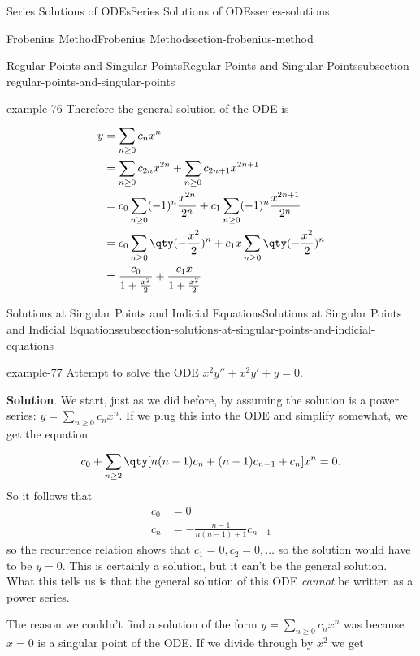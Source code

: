 \documentclass[oneside,10pt,]{book}
\numberwithin{equation}{section}
\newcommand{\amp}{&}
\begin{document}
\begin{chapterptx}{Series Solutions of ODEs}{}{Series Solutions of ODEs}{}{}{series-solutions}
\begin{sectionptx}{Frobenius Method}{}{Frobenius Method}{}{}{section-frobenius-method}
\begin{subsectionptx}{Regular Points and Singular Points}{}{Regular Points and Singular Points}{}{}{subsection-regular-points-and-singular-points}
\begin{example}{}{example-76}
Therefore the general solution of the ODE is%
\begin{align*}
y \amp= \sum_{n\geq0}^{}c_{n}x^{n}\\
\amp= \sum_{n\geq0}c_{2n}x^{2n} + \sum_{n\geq0}c_{2n+1}x^{2n+1}\\
\amp= c_{0}\sum_{n\geq0}^{}(-1)^{n}\frac{x^{2n}}{2^{n}}+c_{1}\sum_{n\geq0}^{}(-1)^{n}\frac{x^{2n+1}}{2^{n}}\\
\amp= c_{0}\sum_{n\geq0}^{}\qty(-\frac{x^{2}}{2})^{n}+c_{1}x\sum_{n\geq0}^{}\qty(-\frac{x^{2}}{2})^{n}\\
\amp= \frac{c_{0}}{1+\frac{x^{2}}{2}} + \frac{c_{1}x}{1+\frac{x^{2}}{2}}
\end{align*}
%
\end{example}
\end{subsectionptx}
%
%
\typeout{************************************************}
\typeout{************************************************}
%
\begin{subsectionptx}{Solutions at Singular Points and Indicial Equations}{}{Solutions at Singular Points and Indicial Equations}{}{}{subsection-solutions-at-singular-points-and-indicial-equations}
\begin{example}{}{example-77}%
\hypertarget{p-470}{}%
Attempt to solve the ODE \(x^{2}y''+x^{2}y'+y=0\).%
\par\smallskip%
\noindent\textbf{Solution}.\hypertarget{solution-74}{}\quad%
\hypertarget{p-471}{}%
We start, just as we did before, by assuming the solution is a power series: \(y=\sum_{n\geq0}^{}c_{n}x^{n}\). If we plug this into the ODE and simplify somewhat, we get the equation%
\begin{equation*}
c_{0}+\sum_{n\geq2}^{}\qty[n(n-1)c_{n}+(n-1)c_{n-1}+c_{n}]x^{n} = 0.
\end{equation*}
So it follows that%
\begin{align*}
c_{0} \amp= 0\\
c_{n} \amp= -\frac{n-1}{n(n-1)+1}c_{n-1}
\end{align*}
so the recurrence relation shows that \(c_{1} = 0, c_{2} = 0,\ldots\) so the solution would have to be \(y=0\). This is certainly a solution, but it can't be the general solution. What this tells us is that the general solution of this ODE \emph{cannot} be written as a power series.%
\end{example}
\hypertarget{p-472}{}%
The reason we couldn't find a solution of the form \(y=\sum_{n\geq0}^{}c_{n}x^{n}\) was because \(x=0\) is a singular point of the ODE. If we divide through by \(x^{2}\) we get%

\end{subsectionptx}
\end{sectionptx}
\end{chapterptx}
\end{document}
